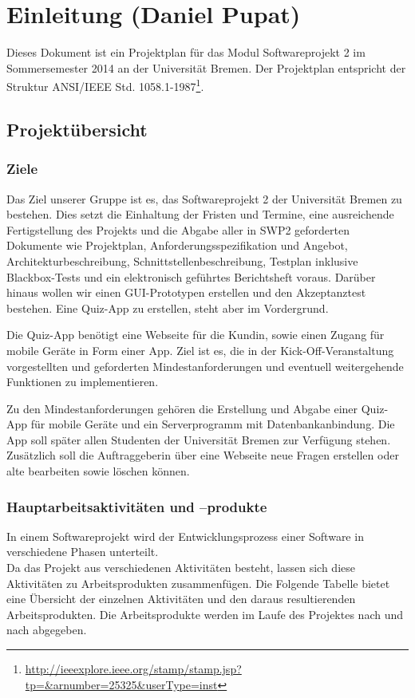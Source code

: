 \documentclass[fontsize=12pt,paper=a4,twoside]{scrartcl}
\begin{document}
\section{Einleitung (Daniel Pupat)}

Dieses Dokument ist ein Projektplan für das Modul Softwareprojekt 2 im Sommersemester 2014 an der Universität Bremen. Der Projektplan entspricht der Struktur ANSI/IEEE Std. 1058.1-1987\footnote{\url{http://ieeexplore.ieee.org/stamp/stamp.jsp?tp=&arnumber=25325&userType=inst}}.

\subsection{Projektübersicht}


\subsubsection{Ziele}

Das Ziel unserer Gruppe ist es, das Softwareprojekt 2 der Universität Bremen zu bestehen. Dies setzt die Einhaltung der Fristen und Termine, eine ausreichende Fertigstellung des Projekts und die Abgabe aller in SWP2 geforderten Dokumente wie Projektplan, Anforderungsspezifikation und Angebot, Architekturbeschreibung, Schnittstellenbeschreibung, Testplan inklusive Blackbox-Tests und ein elektronisch geführtes Berichtsheft voraus. Darüber hinaus wollen wir einen GUI-Prototypen erstellen und den Akzeptanztest bestehen. Eine Quiz-App zu erstellen, steht aber im Vordergrund.

Die Quiz-App benötigt eine Webseite für die Kundin, sowie einen Zugang für mobile Geräte in Form einer App.
 Ziel ist es, die in der Kick-Off-Veranstaltung vorgestellten und geforderten Mindestanforderungen und eventuell weitergehende Funktionen zu implementieren.

Zu den Mindestanforderungen gehören die Erstellung und Abgabe einer Quiz-App für mobile Geräte und ein Serverprogramm mit Datenbankanbindung. Die App soll später allen Studenten der Universität Bremen zur Verfügung stehen. Zusätzlich soll die Auftraggeberin über eine Webseite neue Fragen erstellen oder alte bearbeiten sowie löschen können.

\subsubsection{Hauptarbeitsaktivitäten und --produkte}

In einem Softwareprojekt wird der Entwicklungsprozess einer Software in verschiedene Phasen unterteilt.\\
Da das Projekt aus verschiedenen Aktivitäten besteht, lassen sich diese Aktivitäten zu Arbeitsprodukten zusammenfügen. Die Folgende Tabelle bietet eine Übersicht der einzelnen Aktivitäten und den daraus resultierenden Arbeitsprodukten. Die Arbeitsprodukte werden im Laufe des Projektes nach und nach abgegeben.\\
\end{document}
